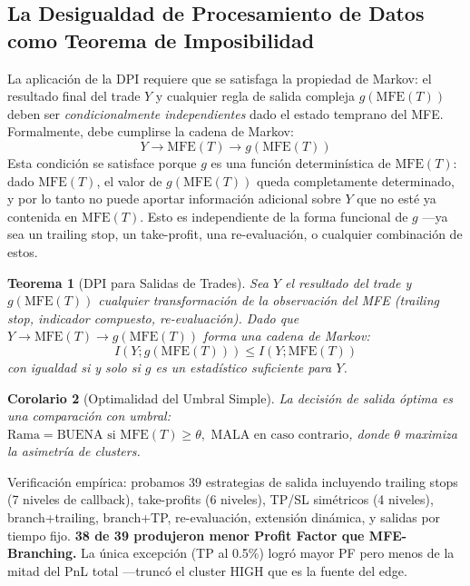 \documentclass[11pt,a4paper]{article}
\newtheorem{theorem}{Teorema}
\newtheorem{corollary}[theorem]{Corolario}
\begin{document}
\subsection{La Desigualdad de Procesamiento de Datos como Teorema de Imposibilidad}

La aplicación de la DPI requiere que se satisfaga la propiedad de Markov: el resultado final del trade $Y$ y cualquier regla de salida compleja $g(\text{MFE}(T))$ deben ser \emph{condicionalmente independientes} dado el estado temprano del MFE. Formalmente, debe cumplirse la cadena de Markov:
\begin{equation}
    Y \longrightarrow \text{MFE}(T) \longrightarrow g(\text{MFE}(T))
\end{equation}
Esta condición se satisface porque $g$ es una función determinística de $\text{MFE}(T)$: dado $\text{MFE}(T)$, el valor de $g(\text{MFE}(T))$ queda completamente determinado, y por lo tanto no puede aportar información adicional sobre $Y$ que no esté ya contenida en $\text{MFE}(T)$. Esto es independiente de la forma funcional de $g$ ---ya sea un trailing stop, un take-profit, una re-evaluación, o cualquier combinación de estos.

\begin{theorem}[DPI para Salidas de Trades]
\label{thm:dpi}
Sea $Y$ el resultado del trade y $g(\text{MFE}(T))$ cualquier transformación de la observación del MFE (trailing stop, indicador compuesto, re-evaluación). Dado que $Y \to \text{MFE}(T) \to g(\text{MFE}(T))$ forma una cadena de Markov:
\begin{equation}
    I(Y; g(\text{MFE}(T))) \leq I(Y; \text{MFE}(T))
\end{equation}
con igualdad si y solo si $g$ es un estadístico suficiente para $Y$.
\end{theorem}

\begin{corollary}[Optimalidad del Umbral Simple]
La decisión de salida óptima es una comparación con umbral:
$\text{Rama} = \text{BUENA si } \text{MFE}(T) \geq \theta, \text{ MALA en caso contrario}$,
donde $\theta$ maximiza la asimetría de clusters.
\end{corollary}

Verificación empírica: probamos 39 estrategias de salida incluyendo trailing stops (7 niveles de callback), take-profits (6 niveles), TP/SL simétricos (4 niveles), branch+trailing, branch+TP, re-evaluación, extensión dinámica, y salidas por tiempo fijo. \textbf{38 de 39 produjeron menor Profit Factor que MFE-Branching.} La única excepción (TP al 0.5\%) logró mayor PF pero menos de la mitad del PnL total ---truncó el cluster HIGH que es la fuente del edge.
\end{document}
